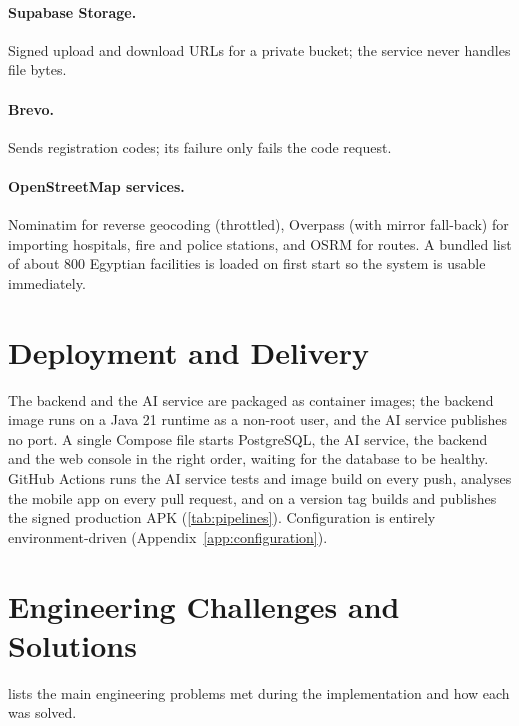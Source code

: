 \paragraph{Supabase Storage.} Signed upload and download URLs for a private bucket; the service never handles file bytes.
\paragraph{Brevo.} Sends registration codes; its failure only fails the code request.
\paragraph{OpenStreetMap services.} Nominatim for reverse geocoding (throttled), Overpass (with mirror fall-back) for importing
hospitals, fire and police stations, and OSRM for routes. A bundled list of about 800 Egyptian facilities is loaded on first
start so the system is usable immediately.

\section{Deployment and Delivery}

The backend and the AI service are packaged as container images; the backend image runs on a Java 21 runtime as a
non-root user, and the AI service publishes no port. A single Compose file starts PostgreSQL, the AI service, the backend
and the web console in the right order, waiting for the database to be healthy. GitHub Actions runs the AI service tests
and image build on every push, analyses the mobile app on every pull request, and on a version tag builds and publishes the
signed production APK (\cref{tab:pipelines}). Configuration is entirely environment-driven (Appendix~\ref{app:configuration}).

\section{Engineering Challenges and Solutions}

 lists the main engineering problems met during the implementation and how each was solved.

